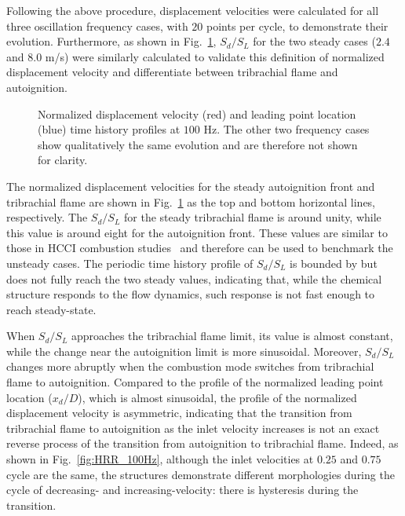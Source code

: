 \documentclass[review,3p,times]{elsarticle}
\begin{document}
Following the above procedure, displacement velocities were calculated for all three oscillation frequency cases, with $20$ points per cycle, to demonstrate their evolution.  Furthermore, as shown in Fig.~\ref{fig:sd_evo}, $S_d/S_L$ for the two steady cases ($2.4$ and $8.0$ m/s) were similarly calculated to validate this definition of normalized displacement velocity and differentiate between tribrachial flame and autoignition.

\begin{figure}[t]
  \centering
  \scriptsize
  \resizebox{0.5\textwidth}{!}{}
  \normalsize
  \caption{Normalized displacement velocity (red) and leading point location (blue) time history profiles at $100$ Hz.  The other two frequency cases show qualitatively the same evolution and are therefore not shown for clarity.}
  \label{fig:sd_evo}
\end{figure}


The normalized displacement velocities for the steady autoignition front and tribrachial flame are shown in Fig.~\ref{fig:sd_evo} as the top and bottom horizontal lines, respectively.  The $S_d/S_L$ for the steady tribrachial flame is around unity, while this value is around eight for the autoignition front.  These values are similar to those in HCCI combustion studies~\cite{yoo13} and therefore can be used to benchmark the unsteady cases.  The periodic time history profile of $S_d/S_L$ is bounded by but does not fully reach the two steady values, indicating that, while the chemical structure responds to the flow dynamics, such response is not fast enough to reach steady-state.  

When $S_d/S_L$ approaches the tribrachial flame limit, its value is almost constant, while the change near the autoignition limit is more sinusoidal.  Moreover, $S_d/S_L$ changes more abruptly when the combustion mode switches from tribrachial flame to autoignition.  Compared to the profile of the normalized leading point location ($x_d/D$), which is almost sinusoidal, the profile of the normalized displacement velocity is asymmetric, indicating that the transition from tribrachial flame to autoignition as the inlet velocity increases is not an exact reverse process of the transition from autoignition to tribrachial flame.  Indeed, as shown in Fig.~\ref{fig:HRR_100Hz}, although the inlet velocities at $0.25$ and $0.75$ cycle are the same, the structures demonstrate different morphologies during the cycle of decreasing- and increasing-velocity: there is hysteresis during the transition.
\end{document}
